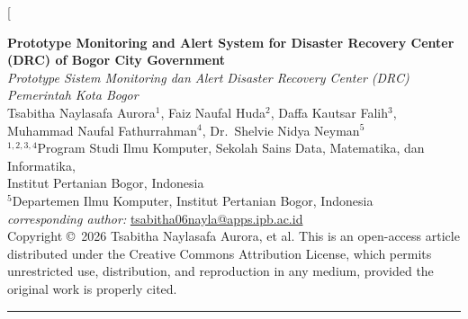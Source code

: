 \documentclass[10pt,twocolumn]{article}
\begin{document}
\twocolumn[{%
\begin{@twocolumnfalse}

  \begin{center}
    {\LARGE\bfseries Prototype Monitoring and Alert System for Disaster Recovery Center (DRC) of Bogor City Government}\\[6pt]

    {\large\itshape Prototype Sistem Monitoring dan Alert Disaster Recovery Center (DRC)\\
    Pemerintah Kota Bogor}\\[10pt]

    {\normalsize
      Tsabitha Naylasafa Aurora$^{1}$,
      Faiz Naufal Huda$^{2}$,
      Daffa Kautsar Falih$^{3}$,\\
      Muhammad Naufal Fathurrahman$^{4}$,
      Dr.\ Shelvie Nidya Neyman$^{5}$
    }\\[4pt]

    {\small
      $^{1,2,3,4}$Program Studi Ilmu Komputer, Sekolah Sains Data, Matematika, dan Informatika,\\
      Institut Pertanian Bogor, Indonesia\\[2pt]
      $^{5}$Departemen Ilmu Komputer, Institut Pertanian Bogor, Indonesia\\[2pt]
      \textit{corresponding author:}
      \href{mailto:tsabitha06nayla@apps.ipb.ac.id}{tsabitha06nayla@apps.ipb.ac.id}
    }\\[6pt]

    {\footnotesize
      Copyright \copyright\ 2026 Tsabitha Naylasafa Aurora, et al.
      This is an open-access article distributed under the Creative Commons Attribution License,
      which permits unrestricted use, distribution, and reproduction in any medium,
      provided the original work is properly cited.
    }
  \end{center}

  \vspace{6pt}
  \hrule
  \vspace{6pt}


\end{@twocolumnfalse}}
\end{document}
